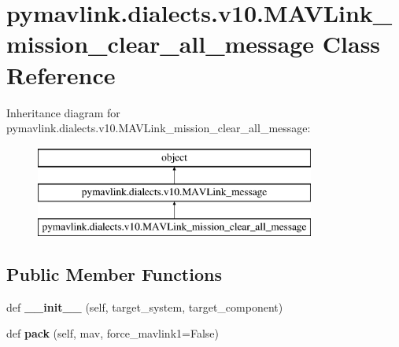 \hypertarget{classpymavlink_1_1dialects_1_1v10_1_1MAVLink__mission__clear__all__message}{}\section{pymavlink.\+dialects.\+v10.\+M\+A\+V\+Link\+\_\+mission\+\_\+clear\+\_\+all\+\_\+message Class Reference}
\label{classpymavlink_1_1dialects_1_1v10_1_1MAVLink__mission__clear__all__message}
Inheritance diagram for pymavlink.\+dialects.\+v10.\+M\+A\+V\+Link\+\_\+mission\+\_\+clear\+\_\+all\+\_\+message\+:\begin{figure}[H]
\begin{center}
\leavevmode
\includegraphics[height=3.000000cm]{classpymavlink_1_1dialects_1_1v10_1_1MAVLink__mission__clear__all__message}
\end{center}
\end{figure}
\subsection*{Public Member Functions}
\begin{DoxyCompactItemize}
\item 
\mbox{\label{classpymavlink_1_1dialects_1_1v10_1_1MAVLink__mission__clear__all__message_a153ab29fcda09f8a338363f935c62314}} 
def {\bfseries \+\_\+\+\_\+init\+\_\+\+\_\+} (self, target\+\_\+system, target\+\_\+component)
\item 
\mbox{\label{classpymavlink_1_1dialects_1_1v10_1_1MAVLink__mission__clear__all__message_a433587b9cbe922ff306b3b5722ec3fba}} 
def {\bfseries pack} (self, mav, force\+\_\+mavlink1=False)
\end{DoxyCompactItemize}
